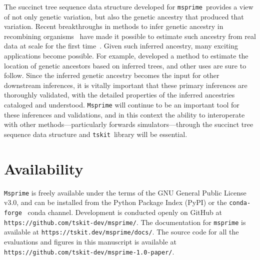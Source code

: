 \documentclass[9pt,twocolumn,twoside,lineno]{gsajnl}
\newcommand{\msprime}[0]{\texttt{msprime}}
\newcommand{\tskit}[0]{\texttt{tskit}}
\begin{document}
The succinct tree sequence data structure developed
for \msprime\ provides a view of not only
genetic variation, but also the genetic ancestry that produced that variation.
Recent breakthroughs in methods to infer genetic ancestry in recombining
organisms~\citep{rasmussen2014genome,kelleher2019inferring,
speidel2019method,wohns2021unified,schaefer2021ancestral,speidel2021inferring}
have made it possible to estimate such ancestry from real data at scale for
the first time~\citep{harris2019database,tang2019genealogy}.
Given such inferred ancestry, many exciting applications
become possible. For example, \cite{osmond2021estimating}
developed a method to estimate the location of genetic ancestors
based on inferred trees, and other uses are sure to follow.
Since the inferred genetic ancestry
becomes the input for other downstream inferences, it is vitally
important that these primary inferences are thoroughly validated,
with the detailed properties of the inferred ancestries
cataloged and understood.
\texttt{Msprime} will continue to be an important tool for these inferences and validations,
and in this context the ability to interoperate
with other methods---particularly forwards simulators---through
the succinct tree sequence data structure and \tskit\ library
will be essential.

\section*{Availability}
\texttt{Msprime} is freely available under the terms of the
GNU General Public License v3.0, and can be installed from the Python
Package Index (PyPI) or the \texttt{conda-forge}~\citep{condaforge2015} conda channel.
Development is conducted openly on GitHub at
\texttt{https://github.com/tskit-dev/msprime/}.
The documentation for \texttt{msprime} is available at
\texttt{https://tskit.dev/msprime/docs/}.
The source code for all the evaluations and figures in this manuscript
is available at \texttt{https://github.com/tskit-dev/msprime-1.0-paper/}.
\end{document}
